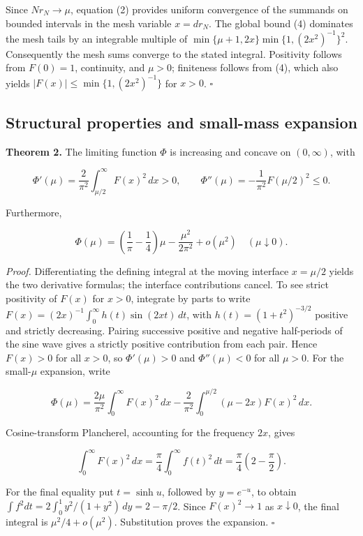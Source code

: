 \documentclass[
  10pt,
  a4paper,
]{article}
\begin{document}
Since \(Nr_N\to\mu\), equation (2) provides uniform convergence of the summands on bounded intervals in the mesh variable \(x=dr_N\). The global bound (4) dominates the mesh tails by an integrable multiple of \(\min\{\mu+1,2x\}\min\{1,(2x^2)^{-1}\}^2\). Consequently the mesh sums converge to the stated integral. Positivity follows from \(F(0)=1\), continuity, and \(\mu>0\); finiteness follows from (4), which also yields \(|F(x)|\le\min\{1,(2x^2)^{-1}\}\) for \(x>0\). \(\square\)

\subsection{Structural properties and small-mass expansion}\label{structural-properties-and-small-mass-expansion}

\textbf{Theorem 2.} The limiting function \(\Phi\) is increasing and concave on \((0,\infty)\), with

\[
\Phi'(\mu)=\frac2{\pi^2}\int_{\mu/2}^\infty F(x)^2\,dx>0,
\qquad
\Phi''(\mu)=-\frac1{\pi^2}F(\mu/2)^2\le0.
\]

Furthermore,

\[
\boxed{
\Phi(\mu)=\left(\frac1\pi-\frac14\right)\mu
-\frac{\mu^2}{2\pi^2}+o(\mu^2)
\quad(\mu\downarrow0).
}
\]

\emph{Proof.} Differentiating the defining integral at the moving interface \(x=\mu/2\) yields the two derivative formulas; the interface contributions cancel. To see strict positivity of \(F(x)\) for \(x>0\), integrate by parts to write \(F(x)=(2x)^{-1}\int_0^\infty h(t)\sin(2xt)\,dt\), with \(h(t)=(1+t^2)^{-3/2}\) positive and strictly decreasing. Pairing successive positive and negative half-periods of the sine wave gives a strictly positive contribution from each pair. Hence \(F(x)>0\) for all \(x>0\), so \(\Phi'(\mu)>0\) and \(\Phi''(\mu)<0\) for all \(\mu>0\). For the small-\(\mu\) expansion, write

\[
\Phi(\mu)=\frac{2\mu}{\pi^2}\int_0^\infty F(x)^2\,dx
-\frac2{\pi^2}\int_0^{\mu/2}(\mu-2x)F(x)^2\,dx.
\]

Cosine-transform Plancherel, accounting for the frequency \(2x\), gives

\[
\int_0^\infty F(x)^2\,dx
=\frac\pi4\int_0^\infty f(t)^2\,dt
=\frac\pi4\left(2-\frac\pi2\right).
\]

For the final equality put \(t=\sinh u\), followed by \(y=e^{-u}\), to obtain \(\int f^2dt=2\int_0^1 y^2/(1+y^2)\,dy=2-\pi/2\). Since \(F(x)^2\to1\) as \(x\downarrow0\), the final integral is \(\mu^2/4+o(\mu^2)\). Substitution proves the expansion. \(\square\)
\end{document}
